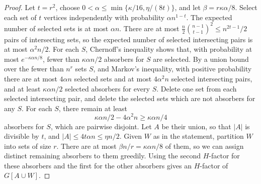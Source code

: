 \begin{proof}
Let $t=r^2$, choose
$0<\alpha\le\min\{\kappa/16,\eta/(8t)\}$, and let
$\beta=r\kappa\alpha/8$.
Select each set of $t$ vertices independently with probability $\alpha n^{1-t}$.
The expected number of selected sets is at most $\alpha n$.
There are at most
$\frac n2\binom{n-1}{t-1}^{2}\le n^{2t-1}/2$
pairs of intersecting sets, so the expected number of selected
intersecting pairs is at most $\alpha^2n/2$. For each $S$, Chernoff's inequality shows that, with probability
at most $e^{-\kappa\alpha n/8}$, fewer than $\kappa\alpha n/2$ absorbers for $S$ are selected.
By a union bound over the fewer than $n^r$ sets $S$, and Markov's
inequality, with positive probability there are at most $4\alpha n$
selected sets and at most $4\alpha^2n$ selected intersecting pairs, and at
least $\kappa\alpha n/2$ selected absorbers for every $S$.
Delete one set from each selected intersecting pair, and delete the selected sets which are not absorbers for any $S$. For each $S$, there remain at least
\[
 \kappa\alpha n/2-4\alpha^2n\ge\kappa\alpha n/4
\]
absorbers for $S$, which are pairwise disjoint. Let $A$ be their union, so that $|A|$ is divisible by $t$, and $|A|\le4t\alpha n\le\eta n/2$.
Given $W$ as in the statement, partition $W$ into sets of size $r$. There are at most
$\beta n/r=\kappa\alpha n/8$ of them, so we can assign distinct
remaining absorbers to them greedily. Using the second $H$-factor for these absorbers and the first for the other absorbers gives an $H$-factor of $G[A\cup W]$.
\end{proof}

